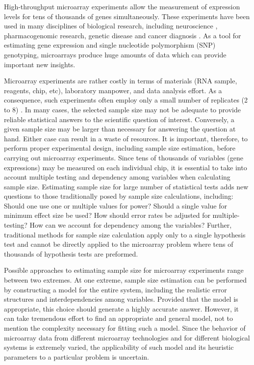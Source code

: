 \documentclass[12pt]{article}
\begin{document}
High-throughput microarray experiments allow the measurement of
expression levels for tens of thousands of genes simultaneously.
These experiments have been used in many disciplines of biological
research, including neuroscience \citep{Mandel03},
pharmacogenomic research, genetic disease and cancer diagnosis
\citep{Heller02}.  As a tool for estimating gene expression and
single nucleotide polymorphism (SNP) genotyping, microarrays produce
huge amounts of data which can provide important new insights.

Microarray experiments are rather costly in terms of materials
(RNA sample, reagents, chip, etc), laboratory manpower, and data
analysis effort.  As a consequence, such experiments often employ
only a small number of replicates (2 to 8) \citep{Speed03}. In
many cases, the selected sample size may not be adequate to
provide reliable statistical answers to the scientific question of
interest. Conversely, a given sample size may be larger than
necessary for answering the question at hand. Either case can
result in a waste of resources. It is important, therefore, to
perform proper experimental design, including sample size
estimation, before carrying out microarray experiments. Since tens
of thousands of variables (gene expressions) may be measured on
each individual chip, it is essential to take into account
multiple testing and dependency among variables when calculating
sample size. Estimating sample size for large number of
statistical tests adds new questions to those traditionally posed
by sample size calculations, including: Should one use one or
multiple values for power? Should a single value for minimum
effect size be used?  How should error rates be adjusted for
multiple-testing?  How can we account for dependency among the
variables?  Further, traditional methods for sample size
calculation apply only to a single hypothesis test and cannot be
directly applied to the microarray problem where tens of thousands
of hypothesis tests are preformed.

Possible approaches to estimating sample size for microarray
experiments range between two extremes. At one extreme, sample
size estimation can be performed by constructing a model for the
entire system, including the realistic error structures and
interdependencies among variables. Provided that the model is
appropriate, this choice should generate a highly accurate answer.
However, it can take tremendous effort to find an appropriate and
general model, not to mention the complexity necessary for fitting
such a model.  Since the behavior of microarray data from
different microarray technologies and for different biological
systems is extremely varied, the applicability of such model and
its heuristic parameters to a particular problem is uncertain.
\end{document}
